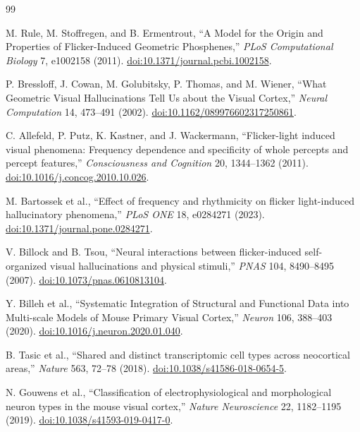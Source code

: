 \documentclass[11pt]{article}
\begin{document}
\begin{thebibliography}{99}

M. Rule, M. Stoffregen, and B. Ermentrout,
``A Model for the Origin and Properties of Flicker-Induced Geometric
Phosphenes,'' \emph{PLoS Computational Biology} 7, e1002158 (2011).
\href{https://doi.org/10.1371/journal.pcbi.1002158}{doi:10.1371/journal.pcbi.1002158}.

P. Bressloff, J. Cowan, M. Golubitsky, P. Thomas, and M. Wiener,
``What Geometric Visual Hallucinations Tell Us about the Visual Cortex,''
\emph{Neural Computation} 14, 473--491 (2002).
\href{https://doi.org/10.1162/089976602317250861}{doi:10.1162/089976602317250861}.

C. Allefeld, P. Putz, K. Kastner, and J. Wackermann,
``Flicker-light induced visual phenomena: Frequency dependence and
specificity of whole percepts and percept features,''
\emph{Consciousness and Cognition} 20, 1344--1362 (2011).
\href{https://doi.org/10.1016/j.concog.2010.10.026}{doi:10.1016/j.concog.2010.10.026}.

M. Bartossek et al.,
``Effect of frequency and rhythmicity on flicker light-induced hallucinatory
phenomena,'' \emph{PLoS ONE} 18, e0284271 (2023).
\href{https://doi.org/10.1371/journal.pone.0284271}{doi:10.1371/journal.pone.0284271}.

V. Billock and B. Tsou,
``Neural interactions between flicker-induced self-organized visual
hallucinations and physical stimuli,'' \emph{PNAS} 104, 8490--8495 (2007).
\href{https://doi.org/10.1073/pnas.0610813104}{doi:10.1073/pnas.0610813104}.

Y. Billeh et al.,
``Systematic Integration of Structural and Functional Data into Multi-scale
Models of Mouse Primary Visual Cortex,'' \emph{Neuron} 106, 388--403 (2020).
\href{https://doi.org/10.1016/j.neuron.2020.01.040}{doi:10.1016/j.neuron.2020.01.040}.

B. Tasic et al.,
``Shared and distinct transcriptomic cell types across neocortical areas,''
\emph{Nature} 563, 72--78 (2018).
\href{https://doi.org/10.1038/s41586-018-0654-5}{doi:10.1038/s41586-018-0654-5}.

N. Gouwens et al.,
``Classification of electrophysiological and morphological neuron types in
the mouse visual cortex,'' \emph{Nature Neuroscience} 22, 1182--1195 (2019).
\href{https://doi.org/10.1038/s41593-019-0417-0}{doi:10.1038/s41593-019-0417-0}.


\end{thebibliography}
\end{document}
